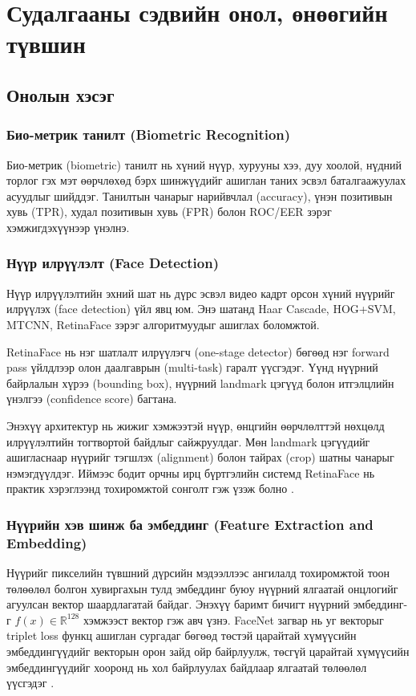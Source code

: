 \chapter{Судалгааны сэдвийн онол, өнөөгийн түвшин}
\section{Онолын хэсэг}

\subsection{Био-метрик танилт (Biometric Recognition)}
Био-метрик (biometric) танилт нь хүний нүүр, хурууны хээ, дуу хоолой, нүдний торлог гэх мэт өөрчлөхөд бэрх шинжүүдийг ашиглан таних эсвэл баталгаажуулах асуудлыг шийддэг. 
Танилтын чанарыг нарийвчлал (accuracy), үнэн позитивын хувь (TPR), 
худал позитивын хувь (FPR) болон ROC/EER зэрэг хэмжигдэхүүнээр үнэлнэ.

\subsection{Нүүр илрүүлэлт (Face Detection)}

Нүүр илрүүлэлтийн эхний шат нь дүрс эсвэл видео кадрт орсон хүний нүүрийг илрүүлэх (face detection) үйл явц юм. Энэ шатанд Haar Cascade, HOG+SVM, MTCNN, RetinaFace зэрэг алгоритмуудыг ашиглах боломжтой. 

RetinaFace нь нэг шатлалт илрүүлэгч (one-stage detector) бөгөөд нэг forward pass үйлдлээр олон даалгаврын (multi-task) гаралт үүсгэдэг. Үүнд нүүрний байрлалын хүрээ (bounding box), нүүрний landmark цэгүүд болон итгэлцлийн үнэлгээ (confidence score) багтана.

Энэхүү архитектур нь жижиг хэмжээтэй нүүр, өнцгийн өөрчлөлттэй нөхцөлд илрүүлэлтийн тогтвортой байдлыг сайжруулдаг. Мөн landmark цэгүүдийг ашигласнаар нүүрийг тэгшлэх (alignment) болон тайрах (crop) шатны чанарыг нэмэгдүүлдэг. Иймээс бодит орчны ирц бүртгэлийн системд RetinaFace нь практик хэрэглээнд тохиромжтой сонголт гэж үзэж болно \cite{deng2019retinaface}.

\subsection{Нүүрийн хэв шинж ба эмбеддинг (Feature Extraction and Embedding)}
Нүүрийг пикселийн түвшний дүрсийн мэдээллээс ангилалд тохиромжтой тоон төлөөлөл болгон хувиргахын тулд эмбеддинг буюу нүүрний ялгаатай онцлогийг агуулсан вектор шаардлагатай байдаг. Энэхүү баримт бичигт нүүрний эмбеддинг-г $f(x) \in \mathbb{R}^{128}$ хэмжээст вектор гэж авч үзнэ. FaceNet загвар нь уг векторыг triplet loss функц ашиглан сургадаг бөгөөд төстэй царайтай хүмүүсийн эмбеддингүүдийг векторын орон зайд ойр байрлуулж, төсгүй царайтай хүмүүсийн эмбеддингүүдийг хооронд нь хол байрлуулах байдлаар ялгаатай төлөөлөл үүсгэдэг \cite{schroff2015facenet}.


